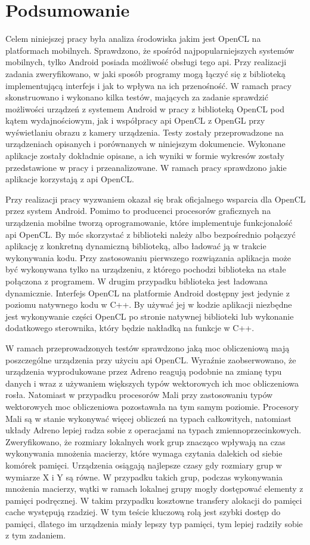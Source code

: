 \section[Podsumowanie]{Podsumowanie}
Celem niniejszej pracy była analiza środowiska jakim jest OpenCL na platformach mobilnych. Sprawdzono, że spośród najpopularniejszych systemów mobilnych, tylko Android posiada możliwość obsługi tego api. Przy realizacji zadania zweryfikowano, w jaki sposób programy mogą łączyć się z biblioteką implementującą interfejs i jak to wpływa na ich przenośność. W ramach pracy skonstruowano i wykonano kilka testów, mających za zadanie sprawdzić możliwości urządzeń z systemem Android w pracy z biblioteką OpenCL pod kątem wydajnościowym, jak i współpracy api OpenCL z OpenGL przy wyświetlaniu obrazu z kamery urządzenia. Testy zostały przeprowadzone na urządzeniach opisanych i porównanych w niniejszym dokumencie. Wykonane aplikacje zostały dokładnie opisane, a ich wyniki w formie wykresów zostały przedstawione w pracy i przeanalizowane. W ramach pracy sprawdzono jakie aplikacje korzystają z api OpenCL.

Przy realizacji pracy wyzwaniem okazał się brak oficjalnego wsparcia dla OpenCL przez system Android. Pomimo to producenci procesorów graficznych na urządzenia mobilne tworzą oprogramowanie, które implementuje funkcjonalość api OpenCL. By móc skorzystać z biblioteki należy albo bezpośrednio połączyć aplikację z konkretną dynamiczną biblioteką, albo ładować ją w trakcie wykonywania kodu. Przy zastosowaniu pierwszego rozwiązania aplikacja może być wykonywana tylko na urządzeniu, z którego pochodzi biblioteka na stałe połączona z programem. W drugim przypadku biblioteka jest ładowana dynamicznie. Interfejs OpenCL na platformie Android dostępny jest jedynie z poziomu natywnego kodu w C++. By używać jej w kodzie aplikacji niezbędne jest wykonywanie części OpenCL po stronie natywnej biblioteki lub wykonanie dodatkowego sterownika, który będzie nakładką na funkcje w C++. 

W ramach przeprowadzonych testów sprawdzono jaką moc obliczeniową mają poszczególne urządzenia przy użyciu api OpenCL. Wyraźnie zaobserwowano, że urządzenia wyprodukowane przez Adreno reagują podobnie na zmianę typu danych i wraz z używaniem większych typów wektorowych ich moc obliczeniowa rosła. Natomiast w przypadku procesorów Mali przy zastosowaniu typów wektorowych moc obliczeniowa pozostawała na tym samym poziomie. Procesory Mali są w stanie wykonywać więcej obliczeń na typach całkowitych, natomiast układy Adreno lepiej radza sobie z operacjami na typach zmiennoprzecinkowych. Zweryfikowano, że rozmiary lokalnych work grup znacząco wpływają na czas wykonywania mnożenia macierzy, które wymaga czytania dalekich od siebie komórek pamięci. Urządzenia osiągają najlepsze czasy gdy rozmiary grup w wymiarze X i Y są równe. W przypadku takich grup, podczas wykonywania mnożenia macierzy, wątki w ramach lokalnej grupy mogły dostępować elementy z pamięci podręcznej. W takim przypadku kosztowne transfery alokacji do pamięci cache występują rzadziej. W tym teście kluczową rolą jest szybki dostęp do pamięci, dlatego im urządzenia miały lepszy typ pamięci, tym lepiej radziły sobie z tym zadaniem. 

